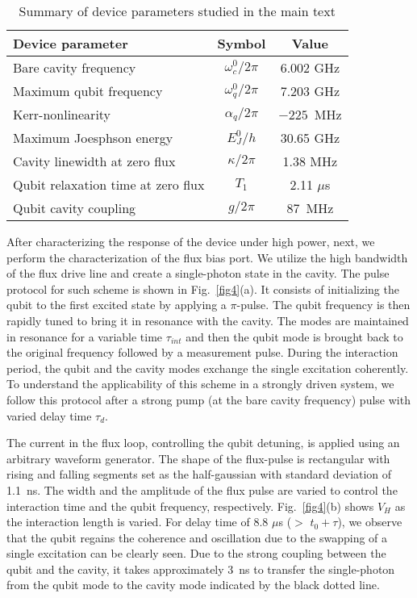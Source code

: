 \documentclass[a4paper, amsfonts, amssymb, amsmath, reprint,showkeys,nofootinbib,superscriptaddress]{revtex4-2}
\begin{document}
\begin{table*}[htb]
	\begin{tabular}{|p{6cm}|c|c|}
		\hline
		\textbf{Device parameter}    & \textbf{Symbol}   	& \textbf{Value}  \\ \hline
		Bare cavity frequency  & $\omega_c^0/2\pi$  & 6.002 GHz   \\ \hline
		Maximum qubit frequency  & $\omega_q^0/2\pi$  & 7.203 GHz  \\ \hline
		Kerr-nonlinearity  & $\alpha_q/2\pi$  & $-225$~MHz  \\ \hline
		Maximum Joesphson energy & $E_{J}^{0}/h$   & 30.65 GHz \\ \hline
		Cavity linewidth at zero flux  & $\kappa/2\pi$ & 1.38 MHz \\ \hline
		Qubit relaxation time at zero flux & $T_1$ & 2.11 $\mu$s\\ \hline
		Qubit cavity coupling & $g/2\pi$ & 87~MHz \\ \hline
	\end{tabular}
	\caption{Summary of device parameters studied in the main text}
	\label{table}
\end{table*}

%
After characterizing the response of the device under high power, next,
we perform the characterization of the flux bias port.
We utilize the high bandwidth of the flux drive line and create
a single-photon state in the cavity. 
%
The pulse protocol for such scheme is shown in Fig.~\ref{fig4}(a). It consists of initializing 
the qubit to the first excited state by applying a $\pi$-pulse. The qubit
frequency is then rapidly tuned to bring it in resonance with the cavity.
%
The modes are maintained in resonance for a variable time $\tau_{int}$ and then
the qubit mode is brought back to the original frequency followed by a measurement
pulse. During the interaction period, the qubit and the cavity modes exchange the 
single excitation coherently.
%
To understand the applicability of this scheme in a strongly driven system, 
we follow this protocol after a strong  pump (at the bare cavity 
frequency) pulse with varied delay time $\tau_d$.





%
The current in the flux loop, controlling the qubit detuning, is applied using an
arbitrary waveform generator. 
%
The shape of the flux-pulse is rectangular with rising  
and falling segments set as the half-gaussian with standard deviation of 1.1~ns. 
%
The width and the amplitude of the flux pulse are varied to control the 
interaction time and the qubit frequency, respectively.
Fig.~\ref{fig4}(b) shows $V_H$ as the interaction length is varied. 
%
For delay time of 8.8 $\mu$s ($>$ $t_0+\tau$), we observe that the qubit 
regains the coherence and oscillation due to the swapping of a single excitation
can be clearly seen.
%
Due to the strong coupling between the qubit and the cavity, it takes 
approximately 3~ns to transfer the single-photon from the qubit 
mode to the cavity mode indicated by the black dotted line.
\end{document}
